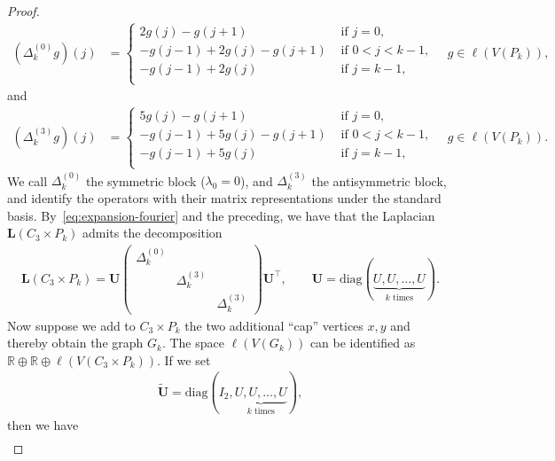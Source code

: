 \documentclass[10pt,a4paper]{amsart}
\begin{document}
\begin{proof}
\begin{align*}
            (\Delta_k^{(0)}g)(j) &= \begin{cases}
                2g(j)-g(j+1) & \text{ if }j=0,\\
                -g(j-1)+2g(j)-g(j+1) & \text{ if }0<j<k-1,\\
                -g(j-1) + 2g(j) & \text{ if }j=k-1,\\
            \end{cases}\quad g\in\ell(V(P_k)),
        \end{align*}
    and
        \begin{align}\label{eq:anti-block}
            (\Delta_k^{(3)}g)(j) &= \begin{cases}
                5g(j)-g(j+1) & \text{ if }j=0,\\
                -g(j-1)+5g(j)-g(j+1) & \text{ if }0<j<k-1,\\
                -g(j-1) + 5g(j) & \text{ if }j=k-1,\\
            \end{cases}\quad g\in\ell(V(P_k)).
        \end{align}
    We call $\Delta_k^{(0)}$ the {symmetric block} ($\lambda_0=0$), and
    $\Delta_k^{(3)}$ the {antisymmetric block}, and identify the operators with their matrix representations under the standard basis. By~\cref{eq:expansion-fourier} and the preceding, we have that the Laplacian $\mathbf{L}(C_3\times P_k)$ admits the decomposition
        \begin{align*}
            \mathbf{L}(C_3\times P_k) = \mathbf{U} \begin{pmatrix}
            \Delta_k^{(0)} & & \\
            & \Delta_k^{(3)} & \\
            & & \Delta_k^{(3)}
        \end{pmatrix} \mathbf{U}^\top,\qquad \mathbf{U} = \mathrm{diag}(\underbrace{U, U, \dotsc,  U}_{k\text{ times}}).
        \end{align*}
    Now suppose we add to $C_3\times P_k$ the two additional ``cap'' vertices $x, y$ and thereby obtain the graph $G_k$. The space $\ell(V(G_k))$ can be identified as $\mathbb{R}\oplus \mathbb{R} \oplus \ell(V(C_3\times P_k))$. If we set 
        \begin{align*}
            \widetilde{\mathbf{U}} = \mathrm{diag}(I_2, \underbrace{U, U, \dotsc,  U}_{k\text{ times}}),
        \end{align*}
    then we have
        \begin{align}\label{eq:block-decomp-L}

\end{align}
\end{proof}
\end{document}

